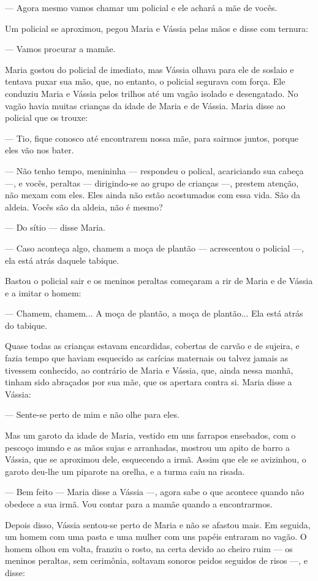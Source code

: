 --- Agora mesmo vamos chamar um policial e ele achará a mãe de vocês.

Um policial se aproximou, pegou Maria e Vássia pelas mãos e disse com
ternura:

--- Vamos procurar a mamãe.

Maria gostou do policial de imediato, mas Vássia olhava para ele de
soslaio e tentava puxar sua mão, que, no entanto, o policial segurava
com força. Ele conduziu Maria e Vássia pelos trilhos até um vagão
isolado e desengatado. No vagão havia muitas crianças da idade de Maria
e de Vássia. Maria disse ao policial que os trouxe:

--- Tio, fique conosco até encontrarem nossa mãe, para sairmos juntos,
porque eles vão nos bater.

--- Não tenho tempo, menininha --- respondeu o polical, acariciando sua
cabeça ---, e vocês, peraltas --- dirigindo-se ao grupo de crianças ---,
prestem atenção, não mexam com eles. Eles ainda não estão acostumados
com essa vida. São da aldeia. Vocês são da aldeia, não é mesmo?

--- Do sítio --- disse Maria.

--- Caso aconteça algo, chamem a moça de plantão --- acrescentou o
policial ---, ela está atrás daquele tabique.

Bastou o policial sair e os meninos peraltas começaram a rir de Maria e
de Vássia e a imitar o homem:

--- Chamem, chamem... A moça de plantão, a moça de plantão... Ela está
atrás do tabique.

Quase todas as crianças estavam encardidas, cobertas de carvão e de
sujeira, e fazia tempo que haviam esquecido as carícias maternais ou
talvez jamais as tivessem conhecido, ao contrário de Maria e Vássia,
que, ainda nessa manhã, tinham sido abraçados por sua mãe, que os
apertara contra si. Maria disse a Vássia:

--- Sente-se perto de mim e não olhe para eles.

Mas um garoto da idade de Maria, vestido em uns farrapos ensebados, com
o pescoço imundo e as mãos sujas e arranhadas, mostrou um apito de barro
a Vássia, que se aproximou dele, esquecendo a irmã. Assim que ele se
avizinhou, o garoto deu-lhe um piparote na orelha, e a turma caiu na
risada.

--- Bem feito --- Maria disse a Vássia ---, agora sabe o que acontece
quando não obedece a sua irmã. Vou contar para a mamãe quando a
encontrarmos.

Depois disso, Vássia sentou-se perto de Maria e não se afastou mais. Em
seguida, um homem com uma pasta e uma mulher com uns papéis entraram no
vagão. O homem olhou em volta, franziu o rosto, na certa devido ao
cheiro ruim --- os meninos peraltas, sem cerimônia, soltavam sonoros
peidos seguidos de risos ---, e disse:

